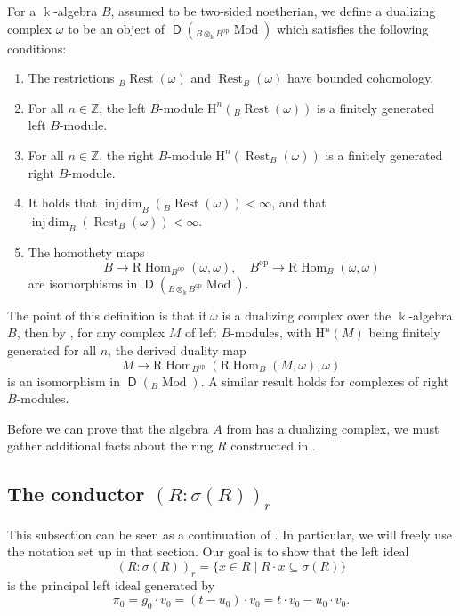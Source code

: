 \documentclass{amsart}
\theoremstyle{definition}
\newcommand{\opn}{\operatorname}
\newcommand{\cat}[1]{\operatorname{\mathsf{#1}}}
\newcommand{\mrm}[1]{\mathrm{#1}}
\renewcommand{\k}{\Bbbk}
\newcommand{\injdim}{\operatorname{inj\,dim}}
\newcommand{\restlb}{{}_B \opn{Rest}}
\newcommand{\restrb}{\opn{Rest}_B}
\numberwithin{equation}{section}
\begin{document}
For a $\k$-algebra $B$, assumed to be two-sided noetherian, we define a dualizing complex $\omega$ to be an object of $\cat{D}({}_{B\otimes_{\k} B^{\opn{op}}} \opn{Mod})$ which satisfies the following conditions:
\begin{enumerate}
\item The restrictions $\restlb(\omega)$ and $\restrb(\omega)$ have bounded cohomology.
\item For all $n \in \mathbb{Z}$, the left $B$-module $\mrm{H}^n(\restlb(\omega))$ is a finitely generated left $B$-module.
\item For all $n \in \mathbb{Z}$, the right $B$-module $\mrm{H}^n(\restrb(\omega))$ is a finitely generated right $B$-module.
\item It holds that $\injdim_B(\restlb(\omega)) < \infty$,
and that $\injdim_B(\restrb(\omega))<\infty$.
\item The homothety maps 
\[
B \to \mrm{R}\opn{Hom}_{B^{\opn{op}}}(\omega,\omega), \quad
B^{\opn{op}} \to \mrm{R}\opn{Hom}_B(\omega,\omega)
\]
are isomorphisms in $\cat{D}({}_{B\otimes_{\k} B^{\opn{op}}} \opn{Mod})$.
\end{enumerate}

The point of this definition is that if $\omega$ is a dualizing complex over the $\k$-algebra $B$,
then by \cite[Proposition 1.3]{YZ1}, for any complex $M$ of left $B$-modules, with $\mrm{H}^n(M)$ being finitely generated for all $n$,
the derived duality map
\[
M \to \mrm{R}\opn{Hom}_{B^{\opn{op}}}(\mrm{R}\opn{Hom}_B(M,\omega),\omega)
\]
is an isomorphism in $\cat{D}({}_B \opn{Mod})$.
A similar result holds for complexes of right $B$-modules.

Before we can prove that the algebra $A$ from  has a dualizing complex, we must gather additional facts about the ring $R$ constructed in .




\subsection{The conductor $(R:\sigma(R))_r$}

This subsection can be seen as a continuation of .
In particular, we will freely use the notation set up in that section.
Our goal is to show that the left ideal 
\[
(R:\sigma(R))_r = \{x \in R \mid R\cdot x \subseteq \sigma(R)\}
\]
is the principal left ideal generated by 
\begin{equation}\label{eqn:pi}
\pi_0 = g_0\cdot v_0 = (t-u_0)\cdot v_0 = t\cdot v_0 -u_0 \cdot v_0.
\end{equation}
\end{document}
